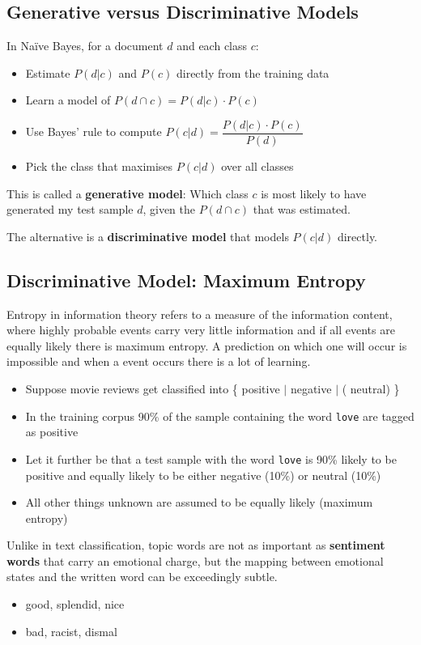 \documentclass[11pt]{article}
\begin{document}
\subsection{Generative versus Discriminative Models}
In Naïve Bayes, for a document $d$ and each class $c$:
\begin{itemize}
	\item Estimate $P(d|c)$ and $P(c)$ directly from the training data
	\item Learn a model of $P(d\cap c) = P(d|c)\cdot P(c)$
	\item Use Bayes' rule to compute $P(c|d)=\dfrac{P(d|c)\cdot P(c)}{P(d)}$
	\item Pick the class that maximises $P(c|d)$ over all classes
\end{itemize}
This is called a \textbf{generative model}: Which class $c$ is most likely to have generated my test sample $d$, given the $P(d\cap c)$ that was estimated.

\noindent
The alternative is a \textbf{discriminative model} that models $P(c|d)$ directly.

\subsection{Discriminative Model: Maximum Entropy}
Entropy in information theory refers to a measure of the information content, where highly probable events carry very little information and if all events are equally likely there is maximum entropy. A prediction on which one will occur is impossible and when a event occurs there is a lot of learning.
\begin{itemize}
	\item Suppose movie reviews get classified into \{ {\color{Green3} positive} $\vert$ {\color{Firebrick3} negative} $\vert$ ({\color{gray} neutral}) \}
	\item In the training corpus 90\% of the sample containing the word \texttt{love} are tagged as {\color{Green3} positive}
	\item Let it further be that a test sample with the word \texttt{love} is 90\% likely to be positive and equally likely to be either {\color{Firebrick3} negative} (10\%) or {\color{gray} neutral} (10\%)
	\item All other things unknown are assumed to be equally likely (maximum entropy)
\end{itemize}
Unlike in text classification, topic words are not as important as \textbf{sentiment words} that carry an emotional charge, but the mapping between emotional states and the written word can be exceedingly subtle.
\begin{itemize}[label=-]
	\item {\color{Green3} good}, {\color{Green3} splendid}, {\color{Green3} nice}
	\item {\color{Firebrick3} bad}, {\color{Firebrick3} racist}, {\color{Firebrick3} dismal}
\end{itemize}
\end{document}
